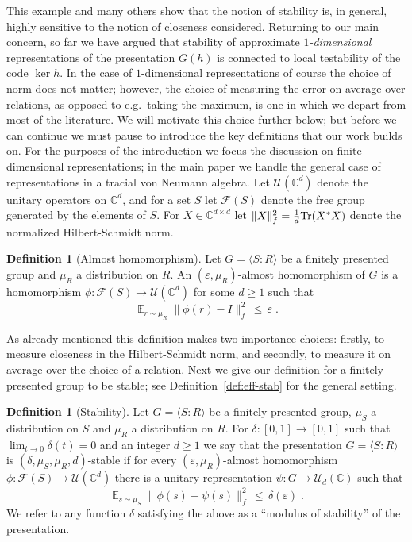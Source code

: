 \documentclass[11pt]{article}
\theoremstyle{definition}
\newtheorem{definition}[theorem]{Definition}
\newcommand{\Tr}{\mbox{\rm Tr}}
\newcommand{\Id}{\ensuremath{I}}
\DeclareMathOperator*{\Expectation}{\mathbb{E}}
\newcommand{\Es}[1]{\Expectation_{#1}}
\newcommand{\C}{\ensuremath{\mathbb{C}}}
\newcommand{\mF}{\ensuremath{\mathcal{F}}}
\newcommand{\mU}{\ensuremath{\mathcal{U}}}
\newcommand{\eps}{\varepsilon}
\begin{document}
This example and many others show that the notion of stability is, in general, highly sensitive to the notion of closeness considered. Returning to our main concern, so far we have argued that 
stability of approximate \emph{$1$-dimensional} representations of the presentation $G(h)$ is connected to local testability of the code $\ker h$. In the case of $1$-dimensional representations of course the choice of norm does not matter; however, the choice of measuring the error on average over relations, as opposed to e.g.\ taking the maximum, is one in which we depart from most of the literature. We will motivate this choice further below; but before we can continue we must pause to introduce the key definitions that our work builds on. For the purposes of the introduction we focus the discussion on finite-dimensional representations; in the main paper we handle the general case of representations in a tracial von Neumann algebra. Let $\mU(\C^d)$ denote the unitary operators on $\C^d$, and for a set $S$ let $\mF(S)$ denote the free group generated by the elements of $S$. For $X\in \C^{d\times d}$ let $\|X\|_f^2 = \frac{1}{d}\Tr(X^* X)$ denote the normalized Hilbert-Schmidt norm. 

\begin{definition}[Almost homomorphism]\label{def:approx-hom-intro}
Let $G = \langle S:R\rangle $ be a finitely presented group and $\mu_R$ a distribution on $R$. An $(\eps,\mu_R)$-almost homomorphism of $G$ is a homomorphism $\phi:\mF(S)\to\mU(\C^d)$ for some $d\geq 1$ such that
\[ \Es{r\sim \mu_R} \big\|  \phi(r) - \Id \big \|_f^2 \,\leq\, \eps\;.\]
\end{definition}

As already mentioned this definition makes two importance choices: firstly, to measure closeness in the Hilbert-Schmidt norm, and secondly, to measure it on average over the choice of a relation. Next we give our definition for a finitely presented group to be stable; see Definition~\ref{def:eff-stab} for the general setting. 

\begin{definition}[Stability]\label{def:eff-stab-intro}
Let $G = \langle S:R\rangle $ be a finitely presented group, $\mu_S$ a distribution on $S$ and $\mu_R$ a distribution on $R$. For $\delta:[0,1]\to[0,1]$ such that $\lim_{t\to 0}\delta(t)=0$ and an integer $d\geq 1$ we say that the presentation $G=\langle S:R\rangle$ is $(\delta,\mu_S,\mu_R,d)$-stable if for every $(\eps,\mu_R)$-almost homomorphism $\phi: \mF(S) \to \mU(\C^d)$ there is a unitary representation $\psi: G \to \mU_d(\C)$ such that
\[ \Es{s\sim \mu_S} \big\|  \phi(s) - \psi(s) \big \|_f^2 \,\leq\, \delta(\eps)\;.\]
We refer to any function $\delta$ satisfying the above as a ``modulus of stability'' of the presentation.
\end{definition}
\end{document}
